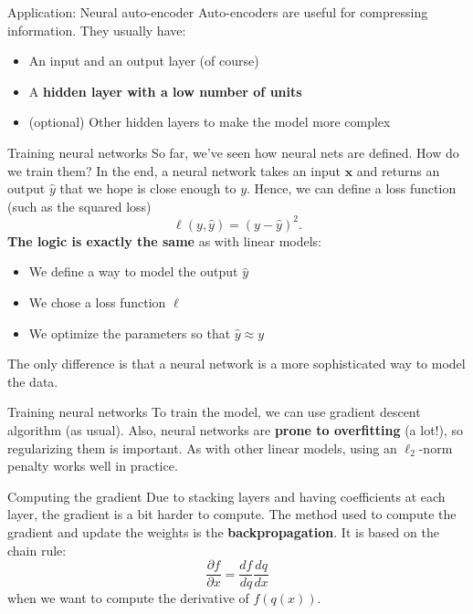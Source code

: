 \documentclass{beamer}
\newcommand{\1}[1]{\mathbbm{1}\left[#1\right]}
\newcommand{\yhat}{\hat{y}}
\newcommand{\bx}{\bm{x}}
\newcommand{\pv}{\pause\vfill}
\begin{document}
\begin{frame}{Application: Neural auto-encoder}
Auto-encoders are useful for compressing information. They usually have:
\begin{itemize}
	\item An input and an output layer (of course)
	\item A \textbf{hidden layer with a low number of units}
	\item (optional) Other hidden layers to make the model more complex
\end{itemize}
\end{frame}

\begin{frame}{Training neural networks}
So far, we've seen how neural nets are defined. How do we train them?
\pv
In the end, a neural network takes an input $\bx$ and returns an output $\yhat$ that we hope is close enough to $y$. Hence, we can define a loss function (such as the squared loss)
\begin{equation*}
\ell(y, \yhat) = \left( y - \yhat\right)^2.
\end{equation*}
\pv \textbf{The logic is exactly the same} as with linear models:
\begin{itemize}
	\item We define a way to model the output $\yhat$
	\item We chose a loss function $\ell$
	\item We optimize the parameters so that $\yhat \approx y$
\end{itemize}
\pv
The only difference is that a neural network is a more sophisticated way to model the data.
\end{frame}

\begin{frame}{Training neural networks}
To train the model, we can use gradient descent algorithm (as usual). 
\pv
Also, neural networks are \textbf{prone to overfitting} (a lot!), so regularizing them is important. As with other linear models, using an $\ell_2$-norm penalty works well in practice.
\end{frame}

\begin{frame}{Computing the gradient}
Due to stacking layers and having coefficients at each layer, the gradient is a bit harder to compute.
\pv
The method used to compute the gradient and update the weights is the \textbf{backpropagation}. It is based on the chain rule:
$$ \dfrac{\partial f}{\partial x} = \dfrac{d f}{d q} \dfrac{d q}{d x}$$
when we want to compute the derivative of $f(q(x))$.
\end{frame}
\end{document}
